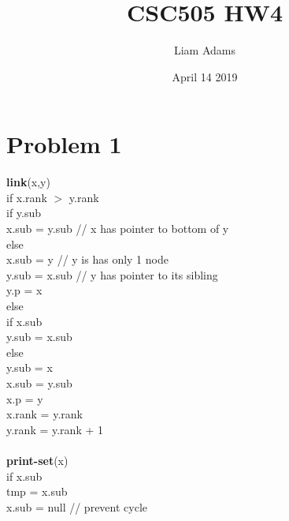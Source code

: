 \documentclass{article}
\title{CSC505 HW4}
\author{Liam Adams}
\date{April 14 2019}
\begin{document}
\maketitle

\section*{Problem 1}
\textbf{link}(x,y)\\
\-\hspace{.5cm}if x.rank $>$ y.rank\\
\-\hspace{1cm}if y.sub\\
\-\hspace{1.5cm}x.sub = y.sub // x has pointer to bottom of y\\
\-\hspace{1cm}else\\
\-\hspace{1.5cm}x.sub = y // y is has only 1 node\\
\-\hspace{1cm}y.sub = x.sub // y has pointer to its sibling\\
\-\hspace{1cm}y.p = x\\
\-\hspace{.5cm}else\\
\-\hspace{1cm}if x.sub\\
\-\hspace{1.5cm}y.sub = x.sub\\
\-\hspace{1cm}else\\
\-\hspace{1.5cm}y.sub = x\\
\-\hspace{1cm}x.sub = y.sub\\
\-\hspace{1cm}x.p = y\\
\-\hspace{1cm}x.rank = y.rank\\
\-\hspace{1.5cm}y.rank = y.rank + 1\\\\
\textbf{print-set}(x)\\
\-\hspace{.5cm}if x.sub\\
\-\hspace{1cm}tmp = x.sub\\
\-\hspace{1cm}x.sub = null // prevent cycle\\
\end{document}
